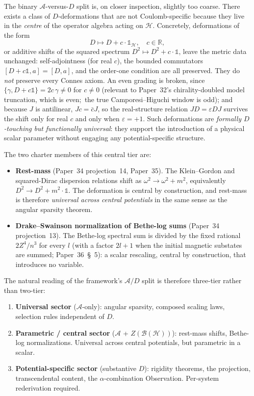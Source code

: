 \documentclass[twocolumn,pra,amsmath,amssymb,superscriptaddress]{revtex4-2}
\begin{document}
The binary $\mathcal{A}$-versus-$D$ split is, on closer inspection,
slightly too coarse.  There exists a class of $D$-deformations
that are not Coulomb-specific because they live in the
\emph{centre} of the operator algebra acting on $\mathcal{H}$.
Concretely, deformations of the form
\[
D \mapsto D + c \cdot \mathbb{1}_{\mathcal{H}},
\quad c \in \mathbb{R},
\]
or additive shifts of the squared spectrum
$D^2 \mapsto D^2 + c \cdot \mathbb{1}$, leave the metric data
unchanged: self-adjointness (for real $c$), the bounded commutators
$[D + c\mathbb{1}, a] = [D, a]$, and the order-one condition are all
preserved.  They do \emph{not} preserve every Connes axiom.  An even
grading is broken, since $\{\gamma, D + c\mathbb{1}\} = 2c\,\gamma
\neq 0$ for $c \neq 0$ (relevant to Paper~32's chirality-doubled model
truncation, which is even;\ the true Camporesi--Higuchi window is odd);
and because $J$ is antilinear, $J c = \bar c J$, so the real-structure
relation $J D = \varepsilon D J$ survives the shift only for real $c$
and only when $\varepsilon = +1$.  Such deformations are
\emph{formally $D$-touching but functionally universal}: they
support the introduction of a physical scalar parameter without
engaging any potential-specific structure.

The two charter members of this central tier are:
\begin{itemize}
\item \textbf{Rest-mass} (Paper~34 projection~14, Paper~35).
  The Klein--Gordon and squared-Dirac dispersion relations shift
  as $\omega^2 \to \omega^2 + m^2$, equivalently
  $D^2 \to D^2 + m^2 \cdot \mathbb{1}$.  The deformation is
  central by construction, and rest-mass is therefore
  \emph{universal across central potentials} in the same sense
  as the angular sparsity theorem.
\item \textbf{Drake--Swainson normalization of Bethe-log sums}
  (Paper~34 projection~13).  The Bethe-log spectral sum is
  divided by the fixed rational $2Z^4/n^3$ for every $l$ (with a
  factor $2l+1$ when the initial magnetic substates are summed;
  Paper~36~\S~5): a scalar rescaling, central by construction,
  that introduces no variable.
\end{itemize}

The natural reading of the framework's $\mathcal{A}/D$ split is
therefore three-tier rather than two-tier:
\begin{enumerate}
\item \textbf{Universal sector} ($\mathcal{A}$-only): angular
  sparsity, composed scaling laws, selection rules independent of
  $D$.
\item \textbf{Parametric / central sector}
  ($\mathcal{A}$ + $Z(\mathcal{B}(\mathcal{H}))$): rest-mass
  shifts, Bethe-log normalizations.  Universal across central
  potentials, but parametric in a scalar.
\item \textbf{Potential-specific sector} (substantive $D$):
  rigidity theorems, the projection, transcendental content,
  the $\alpha$-combination Observation.  Per-system rederivation required.
\end{enumerate}
\end{document}

